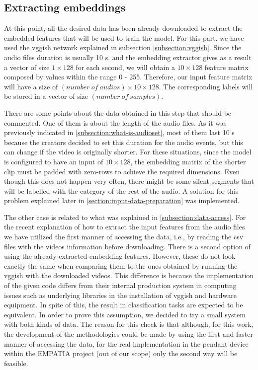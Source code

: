 \subsection{Extracting embeddings}
\label{subsection:extracting-embeddings}

	At this point, all the desired data has been already downloaded to extract the embedded features that will be used to train the model. For this part, we have used the \acrshort{vgg}ish network explained in subsection \ref{subsection:vggish}. Since the audio files duration is usually 10 s, and the embedding extractor gives as a result a vector of size $1 \times 128$ for each second, we will obtain a $10 \times 128$ feature matrix composed by values within the range 0 - 255. Therefore, our input feature matrix will have a size of $(number\ of\ audios) \times 10 \times 128$. The corresponding labels will be stored in a vector of size $(number\ of\ samples)$.
	
	There are some points about the data obtained in this step that should be commented. One of them is about the length of the audio files. As it was previously indicated in \ref{subsection:what-is-audioset}, most of them last 10 s because the creators decided to set this duration for the audio events, but this can change if the video is originally shorter. For these situations, since the model is configured to have an input of $10 \times 128$, the embedding matrix of the shorter clip must be padded with zero-rows to achieve the required dimensions. Even though this does not happen very often, there might be some silent segments that will be labelled with the category of the rest of the audio. A solution for this problem explained later in \ref{section:input-data-preparation} was implemented.
	
	The other case is related to what was explained in \ref{subsection:data-access}. For the recent explanation of how to extract the input features from the audio files we have utilized the first manner of accessing the data, i.e., by reading the \acrshort{csv} files with the videos information before downloading. There is a second option of using the already extracted embedding features. However, these do not look exactly the same when comparing them to the ones obtained by running the \acrshort{vgg}ish with the downloaded videos. This difference is because the implementation of the given code differs from their internal production system in computing issues such as underlying libraries in the installation of \acrshort{vgg}ish and hardware equipment. In spite of this, the result in classification tasks are expected to be equivalent. In order to prove this assumption, we decided to try a small system with both kinds of data. The reason for this check is that although, for this work, the development of the methodologies could be made by using the first and faster manner of accessing the data, for the real implementation in the pendant device within the EMPATIA project (out of our scope) only the second way will be feasible.

